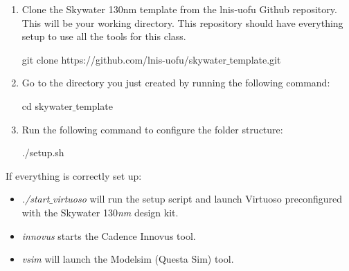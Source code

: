 \begin{enumerate}
	\item Clone the Skywater 130nm template from the lnis-uofu Github repository. This will be your working directory. This repository should have everything setup to use all the tools for this class.

	\begin{codeline}
	git clone https://github.com/lnis-uofu/skywater$\_$template.git
	\end{codeline}

	\item Go to the directory you just created by running the following command:
	\begin{codeline}
	cd skywater$\_$template
	\end{codeline}

	\item Run the following command to configure the folder structure:
	\begin{codeline}
	./setup.sh
	\end{codeline}
\end{enumerate}
		\vspace{+1mm}

\begin{remark}
If everything is correctly set up:
	\begin{itemize}
		\item \textit{./start$\_$virtuoso} will run the setup script and launch Virtuoso preconfigured with the Skywater 130\emph{nm} design kit.
		\item \textit{innovus} starts the Cadence Innovus tool.
		\item \textit{vsim} will launch the Modelsim (Questa Sim) tool.
	\end{itemize} 
\end{remark}
